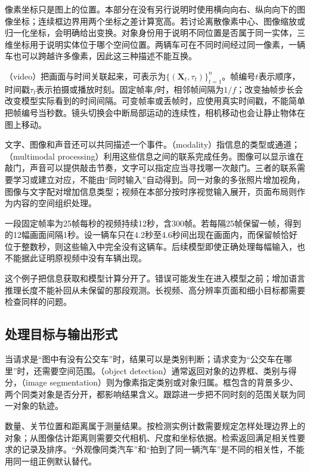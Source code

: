 像素坐标只是图上的位置。本部分在没有另行说明时使用横向向右、纵向向下的图像坐标；连续框边界用两个坐标之差计算宽高。若讨论离散像素中心、图像缩放或归一化坐标，会明确给出变换。对象身份用于说明不同位置是否属于同一实体，三维坐标用于说明实体位于哪个空间位置。两辆车可在不同时间经过同一像素，一辆车也可以跨越许多像素，因此这三种描述不能互换。

（video）把画面与时间关联起来，可表示为$\{(\bm{X}_t,\tau_t)\}_{t=1}^{n}$。帧编号$t$表示顺序，时间戳$\tau_t$表示拍摄或播放时刻。固定帧率$f$时，相邻帧间隔为$1/f$；改变抽帧步长会改变模型实际看到的时间间隔。可变帧率或丢帧时，应使用真实时间戳，不能简单把帧编号当秒数。镜头切换会中断局部运动的连续性，相机移动也会让静止物体在图上移动。

文字、图像和声音还可以共同描述一个事件。（modality）指信息的类型或通道；（multimodal processing）利用这些信息之间的联系完成任务。图像可以显示谁在敲门，声音可以提供敲击节奏，文字可以指定应当寻找哪一次敲门。三者的联系需要学习或建立对应，不能由“同时输入”自动得到。同一对象的多张照片增加视角，图像与文字配对增加信息类型；视频在本部分按时序视觉输入展开，页面布局则作为内容的空间组织处理。

\begin{example}[采样之后还能看见什么]
  \label{ex:vision-overview-sampling}
  一段固定帧率为25帧每秒的视频持续12秒，含300帧。若每隔25帧保留一帧，得到的12幅画面间隔1秒。设一辆车只在4.2秒至4.6秒间出现在画面内，而保留帧恰好位于整数秒，则这些输入中完全没有这辆车。后续模型即使正确处理每幅输入，也不能据此证明原视频中没有车辆出现。
\end{example}

这个例子把信息获取和模型计算分开了。错误可能发生在进入模型之前；增加语言推理长度不能补回从未保留的那段观测。长视频、高分辨率页面和细小目标都需要检查同样的问题。

\subsection{处理目标与输出形式}
\label{sec:vision-overview-outputs}

当请求是“图中有没有公交车”时，结果可以是类别判断；请求变为“公交车在哪里”时，还需要空间范围。（object detection）通常返回对象的边界框、类别与得分，（image segmentation）则为像素指定类别或对象归属。框包含的背景多少、两个同类对象是否分开，都影响结果含义。跟踪进一步把不同时刻的范围关联为同一对象的轨迹。

数量、关节位置和距离属于测量结果。按检测实例计数需要规定怎样处理边界上的对象；从图像估计距离则需要交代相机、尺度和坐标依据。检索返回满足相关性要求的记录及排序。“外观像同类汽车”和“拍到了同一辆汽车”是不同的相关性，不能用同一组正例默认替代。

